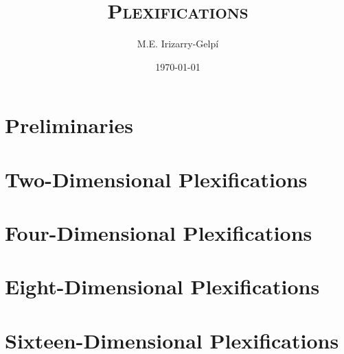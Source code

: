 \documentclass[letterpaper, 12pt]{report}
\begin{document}
\title{\textsc{Plexifications}}
\author{M.E. Irizarry-Gelp\'{i}}
\date{\today}
\maketitle
\tableofcontents
\part{Preliminaries}


\part{Two-Dimensional Plexifications}



\part{Four-Dimensional Plexifications}





\part{Eight-Dimensional Plexifications}







\part{Sixteen-Dimensional Plexifications}









\end{document}
